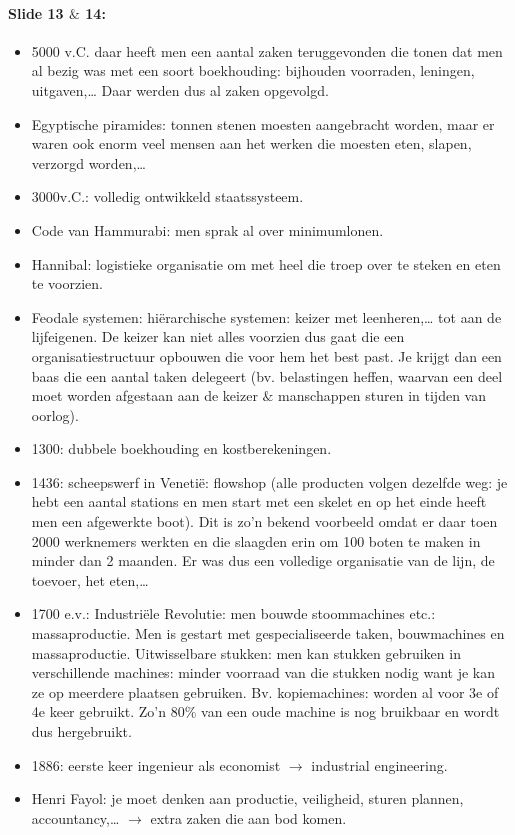 \documentclass[10pt,a4paper]{report}
\begin{document}
\paragraph{Slide 13 $\&$ 14:}
\begin{itemize}
\item 5000 v.C. daar heeft men een aantal zaken teruggevonden die tonen dat men al bezig was met een soort boekhouding: bijhouden voorraden, leningen, uitgaven,… Daar werden dus al zaken opgevolgd.
\item Egyptische piramides: tonnen stenen moesten aangebracht worden, maar er waren ook enorm veel mensen aan het werken die moesten eten, slapen, verzorgd worden,…
\item 3000v.C.: volledig ontwikkeld staatssysteem.
\item Code van Hammurabi: men sprak al over minimumlonen.
\item Hannibal: logistieke organisatie om met heel die troep over te steken en eten te voorzien.
\item Feodale systemen: hi\"erarchische systemen: keizer met leenheren,… tot aan de lijfeigenen. De keizer kan niet alles voorzien dus gaat die een organisatiestructuur opbouwen die voor hem het best past. Je krijgt dan een baas die een aantal taken delegeert (bv. belastingen heffen, waarvan een deel moet worden afgestaan aan de keizer $\&$ manschappen sturen in tijden van oorlog).
\item 1300: dubbele boekhouding en kostberekeningen.
\item 1436: scheepswerf in Venetië: flowshop (alle producten volgen dezelfde weg: je hebt een aantal stations en men start met een skelet en op het einde heeft men een afgewerkte boot). Dit is zo'n bekend voorbeeld omdat er daar toen 2000 werknemers werkten en die slaagden erin om 100 boten te maken in minder dan 2 maanden. Er was dus een volledige organisatie van de lijn, de toevoer, het eten,…
\item 1700 e.v.: Industri\"ele Revolutie: men bouwde stoommachines etc.: massaproductie. Men is gestart met gespecialiseerde taken, bouwmachines en massaproductie. Uitwisselbare stukken: men kan stukken gebruiken in verschillende machines: minder voorraad van die stukken nodig want je kan ze op meerdere plaatsen gebruiken. Bv. kopiemachines: worden al voor 3e of 4e keer gebruikt. Zo'n 80\% van een oude machine is nog bruikbaar en wordt dus hergebruikt.
\item 1886: eerste keer ingenieur als economist $\rightarrow$ industrial engineering.
\item Henri Fayol: je moet denken aan productie, veiligheid, sturen plannen, accountancy,… $\rightarrow$ extra zaken die aan bod komen.
	\end{itemize}
	
\end{document}
